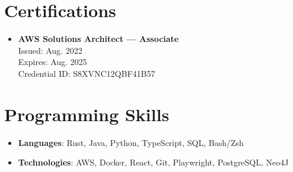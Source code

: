 \documentclass[letterpaper,11pt]{article}
\newcommand{\resumeSubHeadingListStart}{\begin{itemize}[leftmargin=*]}
\newcommand{\resumeSubHeadingListEnd}{\end{itemize}}
\begin{document}
\section{Certifications}
    \resumeSubHeadingListStart
        \item{
            \textbf{AWS Solutions Architect --- Associate}\\
            \hspace{.3cm}\small Issued: Aug. 2022\\
            \hspace{.3cm}\small Expires: Aug. 2025\\
            \hspace{.3cm}\small Credential ID: S8XVNC12QBF41B57\\
        }
    \resumeSubHeadingListEnd


\section{Programming Skills}
    \resumeSubHeadingListStart
        \item{
            \textbf{Languages}{: Rust, Java, Python, TypeScript, SQL, Bash/Zsh}
        }
        \vspace{-.3cm}
        \item{
            \textbf{Technologies}{: AWS, Docker, React, Git, Playwright, PostgreSQL, Neo4J}
        }
    \resumeSubHeadingListEnd
\end{document}
